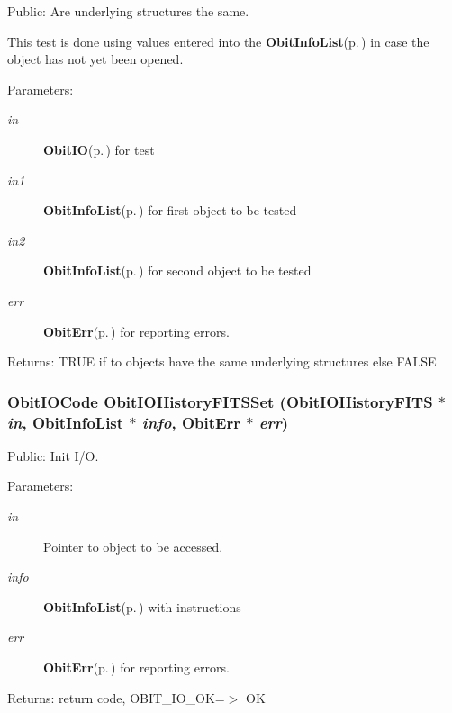 Public: Are underlying structures the same. 

This test is done using values entered into the {\bf Obit\-Info\-List}{\rm (p.\,\pageref{structObitInfoList})} in case the object has not yet been opened. \begin{Desc}
\item[Parameters:]
\begin{description}
\item[{\em in}]{\bf Obit\-IO}{\rm (p.\,\pageref{structObitIO})} for test \item[{\em in1}]{\bf Obit\-Info\-List}{\rm (p.\,\pageref{structObitInfoList})} for first object to be tested \item[{\em in2}]{\bf Obit\-Info\-List}{\rm (p.\,\pageref{structObitInfoList})} for second object to be tested \item[{\em err}]{\bf Obit\-Err}{\rm (p.\,\pageref{structObitErr})} for reporting errors. \end{description}
\end{Desc}
\begin{Desc}
\item[Returns:]TRUE if to objects have the same underlying structures else FALSE \end{Desc}
\subsubsection{\setlength{\rightskip}{0pt plus 5cm}Obit\-IOCode Obit\-IOHistory\-FITSSet ({\bf Obit\-IOHistory\-FITS} $\ast$ {\em in}, {\bf Obit\-Info\-List} $\ast$ {\em info}, {\bf Obit\-Err} $\ast$ {\em err})}\label{ObitIOHistoryFITS_8h_a13}


Public: Init I/O. 

\begin{Desc}
\item[Parameters:]
\begin{description}
\item[{\em in}]Pointer to object to be accessed. \item[{\em info}]{\bf Obit\-Info\-List}{\rm (p.\,\pageref{structObitInfoList})} with instructions \item[{\em err}]{\bf Obit\-Err}{\rm (p.\,\pageref{structObitErr})} for reporting errors. \end{description}
\end{Desc}
\begin{Desc}
\item[Returns:]return code, OBIT\_\-IO\_\-OK=$>$ OK \end{Desc}
